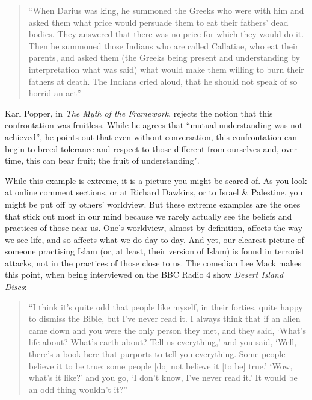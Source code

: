 \documentclass[]{article}
\begin{document}
\begin{quote}
``When Darius was king, he summoned the Greeks who were with him and
asked them what price would persuade them to eat their fathers' dead
bodies. They answered that there was no price for which they would do
it. Then he summoned those Indians who are called Callatiae, who eat
their parents, and asked them (the Greeks being present and
understanding by interpretation what was said) what would make them
willing to burn their fathers at death. The Indians cried aloud, that he
should not speak of so horrid an
act''\autocite{HerodotusHistoryHerodotus1910}
\end{quote}

Karl Popper, in \emph{The Myth of the Framework}, rejects the notion
that this confrontation was fruitless. While he agrees that ``mutual
understanding was not
achieved''\autocite[pg 37]{PopperMythFrameworkdefence1997}, he points
out that even without conversation, this confrontation can begin to
breed tolerance and respect to those different from ourselves and, over
time, this can bear fruit; the fruit of
understanding"\autocite{PopperMythFrameworkdefence1997}.

While this example is extreme, it is a picture you might be scared of.
As you look at online comment sections, or at Richard Dawkins, or to
Israel \& Palestine, you might be put off by others' worldview. But
these extreme examples are the ones that stick out most in our mind
because we rarely actually see the beliefs and practices of those near
us. One's worldview, almost by definition, affects the way we see life,
and so affects what we do day-to-day. And yet, our clearest picture of
someone practising Islam (or, at least, their version of Islam) is found
in terrorist attacks, not in the practices of those close to us. The
comedian Lee Mack makes this point, when being interviewed on the BBC
Radio 4 show \emph{Desert Island Discs}:

\begin{quote}
``I think it's quite odd that people like myself, in their forties,
quite happy to dismiss the Bible, but I've never read it. I always think
that if an alien came down and you were the only person they met, and
they said, `What's life about? What's earth about? Tell us everything,'
and you said, `Well, there's a book here that purports to tell you
everything. Some people believe it to be true; some people {[}do{]} not
believe it {[}to be{]} true.' `Wow, what's it like?' and you go, `I
don't know, I've never read it.' It would be an odd thing wouldn't
it?''\autocite{BBCRadio4DesertIslandDiscs13}
\end{quote}
\end{document}
